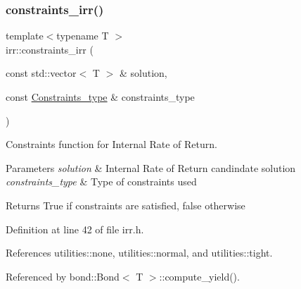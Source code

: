 \subsubsection{\texorpdfstring{constraints\+\_\+irr()}{constraints\_irr()}}
{\footnotesize\ttfamily template$<$typename T $>$ \\
irr\+::constraints\+\_\+irr (\begin{DoxyParamCaption}\item[{const std\+::vector$<$ T $>$ \&}]{solution,  }\item[{const \hyperlink{namespaceutilities_ab1a1517bf6e62a1acfab5293ca8985c1}{Constraints\+\_\+type} \&}]{constraints\+\_\+type }\end{DoxyParamCaption})}



Constraints function for Internal Rate of Return. 


\begin{DoxyParams}{Parameters}
{\em solution} & Internal Rate of Return candindate solution \\
\hline
{\em constraints\+\_\+type} & Type of constraints used \\
\hline
\end{DoxyParams}
\begin{DoxyReturn}{Returns}
True if constraints are satisfied, false otherwise 
\end{DoxyReturn}


Definition at line 42 of file irr.\+h.



References utilities\+::none, utilities\+::normal, and utilities\+::tight.



Referenced by bond\+::\+Bond$<$ T $>$\+::compute\+\_\+yield().


